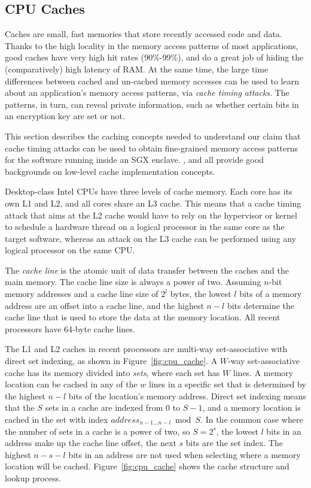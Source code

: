 \subsection{CPU Caches}
\label{sec:caching}

Caches are small, fast memories that store recently accessed code and data.
Thanks to the high locality in the memory access patterns of most applications,
good caches have very high hit rates (90\%-99\%), and do a great job of hiding
the (comparatively) high latency of RAM. At the same time, the large time
differences between cached and un-cached memory accesses can be used to learn
about an application's memory access patterns, via
\textit{cache timing attacks}\cite{banescu2011cache}. The patterns, in turn,
can reveal private information, such as whether certain bits in an encryption
key are set or not.

This section describes the caching concepts needed to understand our claim that
cache timing attacks can be used to obtain fine-grained memory access patterns
for the software running inside an SGX enclave. \cite{smith1982cache},
\cite{patterson2013architecture} and \cite{hennessy2012architecture} all
provide good backgrounds on low-level cache implementation concepts.

Desktop-class Intel CPUs have three levels of cache memory. Each core has its
own L1 and L2, and all cores share an L3 cache. This means that a cache timing
attack that aims at the L2 cache would have to rely on the hypervisor or kernel
to schedule a hardware thread on a logical processor in the same core as the
target software, whereas an attack on the L3 cache can be performed using any
logical processor on the same CPU.

The \textit{cache line} is the atomic unit of data transfer between the caches
and the main memory. The cache line size is always a power of two. Assuming
$n$-bit memory addresses and a cache line size of $2^{l}$ bytes, the lowest
$l$ bits of a memory address are an offset into a cache line, and the highest
$n - l$ bits determine the cache line that is used to store the data at the
memory location. All recent processors have 64-byte cache lines.

The L1 and L2 caches in recent processors are multi-way set-associative with
direct set indexing, as shown in Figure~\ref{fig:cpu_cache}. A $W$-way
set-associative cache has its memory divided into \textit{sets}, where each set
has $W$ lines. A memory location can be cached in any of the $w$ lines in a
specific set that is determined by the highest $n - l$ bits of the location's
memory address. Direct set indexing means that the $S$ sets in a cache are
indexed from $0$ to $S - 1$, and a memory location is cached in the set with
index $address_{n - 1 \ldots n - l} \bmod S$. In the common case where the
number of sets in a cache is a power of two, so $S = 2^{s}$, the lowest $l$
bits in an address make up the cache line offset, the next $s$ bits are the set
index. The highest $n - s - l$ bits in an address are not used when selecting
where a memory location will be cached. Figure~\ref{fig:cpu_cache} shows the
cache structure and lookup process.

